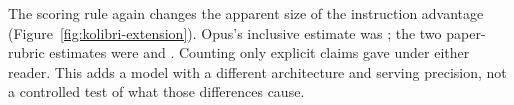 The scoring rule again changes the apparent size of the instruction
advantage (Figure~\ref{fig:kolibri-extension}). Opus's inclusive estimate
was \KEXMainOpusInclusiveSHHSCompleteEstimate{}; the two paper-rubric
estimates were \KEXMainAstraPaperSHHSCompleteEstimate{} and
\KEXMainOpusPaperSHHSCompleteEstimate{}. Counting only explicit claims
gave \KEXMainAstraExplicitSHHSCompleteEstimate{} under either reader.
This adds a model with a different architecture and serving precision,
not a controlled test of what those differences cause.
